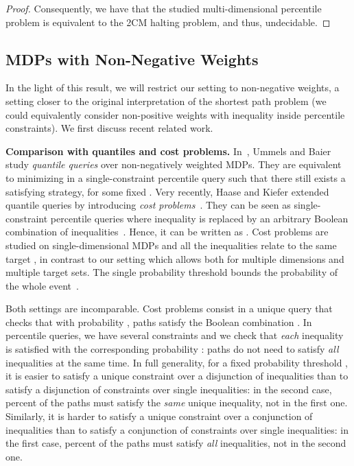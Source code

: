 \documentclass{llncs}
\begin{document}
\begin{proof}
Consequently, we have that the studied multi-dimensional percentile problem is equivalent to the 2CM halting problem, and thus, undecidable.
\end{proof}

\subsection{MDPs with Non-Negative Weights}

In the light of this result, we will restrict our setting to non-negative weights, a setting closer to the original interpretation of the shortest path problem (we could equivalently consider non-positive weights with inequality  inside percentile constraints). We first discuss recent related work.

\smallskip\noindent\textbf{Comparison with quantiles and cost problems.} In~\cite{DBLP:conf/fossacs/UmmelsB13}, Ummels and Baier study \textit{quantile queries} over non-negatively weighted MDPs. They are equivalent to minimizing  in a single-constraint percentile query  such that there still exists a satisfying strategy, for some fixed . Very recently, Haase and Kiefer extended quantile queries by introducing \textit{cost problems}~\cite{HaaseK14}. They can be seen as single-constraint percentile queries where inequality  is replaced by an arbitrary Boolean combination of inequalities~. Hence, it can be written as .
Cost problems are studied on single-dimensional MDPs and all the inequalities relate to the same target , in contrast to our setting which allows both for multiple dimensions and multiple target sets. The single probability threshold bounds the probability of the whole event~.
	
Both settings are incomparable. 
Cost problems consist in a unique query that checks that with probability , paths satisfy the Boolean combination . In percentile queries, we have several constraints and we check that \textit{each} inequality is satisfied with the corresponding probability : paths do not need to satisfy \textit{all} inequalities at the same time. In full generality, for a fixed probability threshold , it is easier to satisfy a unique constraint over a disjunction of inequalities than to satisfy a disjunction of constraints over single inequalities: in the second case,  percent of the paths must satisfy the \textit{same} unique inequality, not in the first one. Similarly, it is harder to satisfy a unique constraint over a conjunction of inequalities than to satisfy a conjunction of constraints over single inequalities: in the first case,  percent of the paths must satisfy \textit{all} inequalities, not in the second one.
\end{document}
